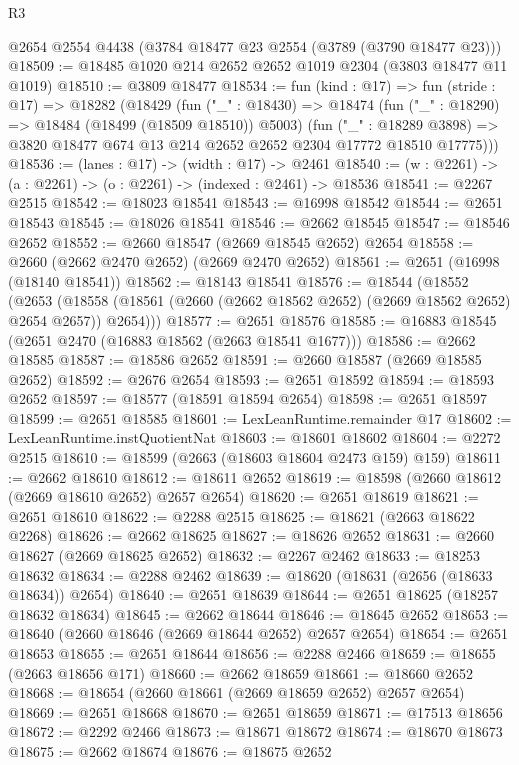 \begin{lexlean}{R3}
\begin{coremodule}
    @2654
    @2554
    @4438
    (@3784 @18477 @23 @2554 (@3789 (@3790 @18477 @23)))
@18509 := @18485 @1020 @214 @2652 @2652 @1019 @2304 (@3803 @18477 @11 @1019)
@18510 := @3809 @18477
@18534 := fun (kind : @17) =>
  fun (stride : @17) =>
  @18282
    (@18429
      (fun ("_" : @18430) =>
      @18474
        (fun ("_" : @18290) => @18484 (@18499 (@18509 @18510)) @5003)
        (fun ("_" : @18289 @3898) =>
        @3820 @18477 @674 @13 @214 @2652 @2652 @2304 @17772 @18510 @17775)))
@18536 := (lanes : @17) -> (width : @17) -> @2461
@18540 := (w : @2261) -> (a : @2261) -> (o : @2261) -> (indexed : @2461) -> @18536
@18541 := @2267 @2515
@18542 := @18023 @18541
@18543 := @16998 @18542
@18544 := @2651 @18543
@18545 := @18026 @18541
@18546 := @2662 @18545
@18547 := @18546 @2652
@18552 := @2660 @18547 (@2669 @18545 @2652) @2654
@18558 := @2660 (@2662 @2470 @2652) (@2669 @2470 @2652)
@18561 := @2651 (@16998 (@18140 @18541))
@18562 := @18143 @18541
@18576 := @18544
    (@18552
      (@2653 (@18558 (@18561 (@2660 (@2662 @18562 @2652) (@2669 @18562 @2652) @2654 @2657)) @2654)))
@18577 := @2651 @18576
@18585 := @16883 @18545 (@2651 @2470 (@16883 @18562 (@2663 @18541 @1677)))
@18586 := @2662 @18585
@18587 := @18586 @2652
@18591 := @2660 @18587 (@2669 @18585 @2652)
@18592 := @2676 @2654
@18593 := @2651 @18592
@18594 := @18593 @2652
@18597 := @18577 (@18591 @18594 @2654)
@18598 := @2651 @18597
@18599 := @2651 @18585
@18601 := LexLeanRuntime.remainder @17
@18602 := LexLeanRuntime.instQuotientNat
@18603 := @18601 @18602
@18604 := @2272 @2515
@18610 := @18599 (@2663 (@18603 @18604 @2473 @159) @159)
@18611 := @2662 @18610
@18612 := @18611 @2652
@18619 := @18598 (@2660 @18612 (@2669 @18610 @2652) @2657 @2654)
@18620 := @2651 @18619
@18621 := @2651 @18610
@18622 := @2288 @2515
@18625 := @18621 (@2663 @18622 @2268)
@18626 := @2662 @18625
@18627 := @18626 @2652
@18631 := @2660 @18627 (@2669 @18625 @2652)
@18632 := @2267 @2462
@18633 := @18253 @18632
@18634 := @2288 @2462
@18639 := @18620 (@18631 (@2656 (@18633 @18634)) @2654)
@18640 := @2651 @18639
@18644 := @2651 @18625 (@18257 @18632 @18634)
@18645 := @2662 @18644
@18646 := @18645 @2652
@18653 := @18640 (@2660 @18646 (@2669 @18644 @2652) @2657 @2654)
@18654 := @2651 @18653
@18655 := @2651 @18644
@18656 := @2288 @2466
@18659 := @18655 (@2663 @18656 @171)
@18660 := @2662 @18659
@18661 := @18660 @2652
@18668 := @18654 (@2660 @18661 (@2669 @18659 @2652) @2657 @2654)
@18669 := @2651 @18668
@18670 := @2651 @18659
@18671 := @17513 @18656
@18672 := @2292 @2466
@18673 := @18671 @18672
@18674 := @18670 @18673
@18675 := @2662 @18674
@18676 := @18675 @2652

\end{coremodule}
\end{lexlean}
